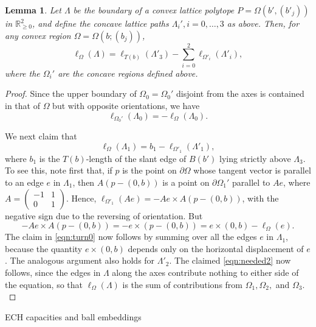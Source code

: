 \documentclass[11pt, reqno]{amsart}
\makeatletter
\def\section{\@startsection{section}{1}%
  \z@{.7\linespacing\@plus\linespacing}{.5\linespacing}%
  {\normalfont\Large\bfseries}}
\newtheorem{lemma}[thm]{Lemma}
\theoremstyle{remark}
\numberwithin{equation}{subsection}
\numberwithin{figure}{section}
\theoremstyle{customremark}
\newcommand{\Om}{{\Omega}}
\newcommand{\La}{{\Lambda}}
\newcommand{\p}{{\partial}}
\newcommand{\R}{\mathbb{R}}
\makeatother
\begin{document}
\begin{lemma}\label{lem:needed} Let $\La$ be the boundary of a convex lattice polytope $P = \Om(b', (b'_j))$ in $\R^2_{\ge 0}$, and  define 
the concave lattice paths $\La_i', i=0,\dots,3$
 as above. 
Then, for any convex region $\Om = \Om(b; (b_j))$,
\begin{equation}
\label{eqn:needed2}
\ell_\Omega(\Lambda) = \ell_{T(b)}(\Lambda'_3) - \sum^2_{i=0}\ell_{\Omega'_i}(\Lambda'_i), 
\end{equation}
where  the $\Om_i'$ are the concave regions defined above.
\end{lemma}
\begin{proof}
 Since  the  upper  boundary of $\Om_0= \Om_0'$ disjoint from the axes is contained in that  of $\Om$ but with   opposite orientations, we have
$$
\ell_{\Omega_0'}(\Lambda_0) = -\ell_{\Omega}(\Lambda_0).
$$

We next claim that 
\begin{equation}
\label{eqn:turn0}
\ell_{\Omega}(\Lambda_1) =  b_1 - \ell_{\Omega'_1}(\Lambda'_1),
\end{equation}
where $b_1$ is the $T(b)$-length of the 
slant edge of $B(b')$ lying strictly above $\La_3$.
To see this, note first that, if $p$ is the point on $\p\Om$ whose tangent vector is parallel to an edge $e$ in $\La_1$, then  $A(p-(0,b))$ is a point on $\p \Om_1'$ parallel to $Ae$, where $A = \begin{pmatrix}-1 & 1\\ 0&1\end{pmatrix}$.
Hence, $\ell_{\Omega'_1}(Ae) = - Ae \times A(p - (0,b))$, with the negative sign due to the reversing of orientation.
But
\[- Ae \times A(p - (0,b)) = - e \times (p - (0,b) ) = 
 e \times (0,b) - \ell_{\Omega}(e).\]
The claim in \eqref{eqn:turn0} now follows by summing over all the edges $e$ in $\Lambda_1$, 
because the quantity $e \times (0,b) $ depends only on the horizontal displacement of $e$.
The analogous argument also holds for $\Lambda'_2$.  The claimed \eqref{eqn:needed2} now follows, since the edges in $\Lambda$ along the axes contribute nothing to either side of the equation, so that $\ell_\Omega(\Lambda)$ is the sum of contributions from $\Omega_1,\Omega_2,$ and $\Omega_3.$
\end{proof}

 
\section{ECH capacities and ball embeddings}\label{sec:ECH}
\end{document}
